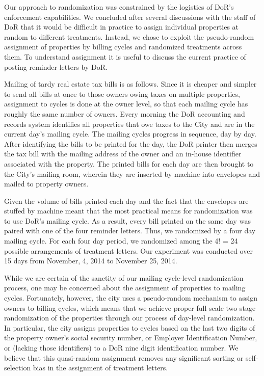 \documentclass[12pt,titlepage]{article}
\begin{document}
Our approach to randomization was constrained by the logistics of
DoR's enforcement capabilities. We concluded after several discussions
with the staff of DoR that it would be difficult in practice
to assign individual properties at random to different
treatments. Instead, we chose to exploit the pseudo-random assignment
of properties by billing cycles and randomized treatments across them.
To understand assignment it is useful to discuss the current
practice of posting reminder letters by DoR.

Mailing of tardy real estate tax bills is as follows.
Since it is cheaper and simpler to send all bills at once to those
owners owing taxes on multiple properties, assignment to cycles is
done at the owner level, so that each mailing cycle has roughly the
same number of owners.  Every morning the DoR accounting and records 
system identifies all properties that owe taxes to the City and are 
in the current day’s mailing cycle.  The mailing cycles progress in 
sequence, day by day.  After identifying the bills to be printed for 
the day, the DoR printer then merges the tax bill with the mailing 
address of the owner and an in-house identifier associated with the 
property.  The printed bills for each day are then brought to the 
City’s mailing room, wherein they are inserted by machine into 
envelopes and mailed to property owners.   
	
Given the volume of bills printed each day and the fact that the 
envelopes are stuffed by machine meant that the most practical means 
for randomization was to use DoR’s mailing cycle.  As a result, 
every bill printed on the same day was paired with one of the four 
reminder letters.  Thus, we randomized by a four day mailing cycle.  
For each four day period, we randomized among the 4! = 24 possible 
arrangements of treatment letters.  Our experiment was conducted 
over 15 days from  November, 4, 2014 to November 25, 2014. 

While we are certain of the sanctity of our mailing cycle-level
randomization process, one may be concerned about the assignment of
properties to mailing cycles. Fortunately, however, the city uses a
pseudo-random mechanism to assign owners to billing cycles, which
means that we achieve proper full-scale two-stage randomization of the
properties through our process of day-level randomization. In
particular, the city assigns properties to cycles based on the last
two digits of the property owner's social security number, or Employer
Identification Number, or (lacking those identifiers) to a DoR nine
digit identification number.  We believe that this quasi-random
assignment removes any significant sorting or self-selection bias in
the assignment of treatment letters.
\end{document}
